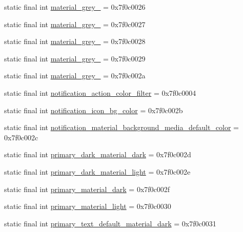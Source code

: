 \begin{CompactItemize}
\item 
static final int \hyperlink{classandroid_1_1support_1_1mediacompat_1_1_r_1_1color_fbf65ae546c3e45c1dd7452aec1b3f7e}{material\_\-grey\_} = 0x7f0c0026
\item 
static final int \hyperlink{classandroid_1_1support_1_1mediacompat_1_1_r_1_1color_62bd8b7b822298a741e85c9d66edf5fd}{material\_\-grey\_} = 0x7f0c0027
\item 
static final int \hyperlink{classandroid_1_1support_1_1mediacompat_1_1_r_1_1color_283260df848554bc065c4ede907a90d8}{material\_\-grey\_} = 0x7f0c0028
\item 
static final int \hyperlink{classandroid_1_1support_1_1mediacompat_1_1_r_1_1color_2206e834f5d056c81661af5f8b333f9b}{material\_\-grey\_} = 0x7f0c0029
\item 
static final int \hyperlink{classandroid_1_1support_1_1mediacompat_1_1_r_1_1color_460a176debd9265fee0094d4292d4864}{material\_\-grey\_} = 0x7f0c002a
\item 
static final int \hyperlink{classandroid_1_1support_1_1mediacompat_1_1_r_1_1color_5fa04e68df1fb16fe48b96cd2c130416}{notification\_\-action\_\-color\_\-filter} = 0x7f0c0004
\item 
static final int \hyperlink{classandroid_1_1support_1_1mediacompat_1_1_r_1_1color_c5e05f3312ba915ed93ada9d7a54586c}{notification\_\-icon\_\-bg\_\-color} = 0x7f0c002b
\item 
static final int \hyperlink{classandroid_1_1support_1_1mediacompat_1_1_r_1_1color_718349b52ce7979a70020368f75009a4}{notification\_\-material\_\-background\_\-media\_\-default\_\-color} = 0x7f0c002c
\item 
static final int \hyperlink{classandroid_1_1support_1_1mediacompat_1_1_r_1_1color_31b4c1efc2dafa6ae6294e79ecb48e60}{primary\_\-dark\_\-material\_\-dark} = 0x7f0c002d
\item 
static final int \hyperlink{classandroid_1_1support_1_1mediacompat_1_1_r_1_1color_df72007f665dc0d7f7261c864f5597b8}{primary\_\-dark\_\-material\_\-light} = 0x7f0c002e
\item 
static final int \hyperlink{classandroid_1_1support_1_1mediacompat_1_1_r_1_1color_7e75ca4e8bc461b949b04d82781d9edb}{primary\_\-material\_\-dark} = 0x7f0c002f
\item 
static final int \hyperlink{classandroid_1_1support_1_1mediacompat_1_1_r_1_1color_7d733ac30a707106882a65738542fae3}{primary\_\-material\_\-light} = 0x7f0c0030
\item 
static final int \hyperlink{classandroid_1_1support_1_1mediacompat_1_1_r_1_1color_e7c671b85dbe3651e030b79de88a7b3c}{primary\_\-text\_\-default\_\-material\_\-dark} = 0x7f0c0031

\end{CompactItemize}

